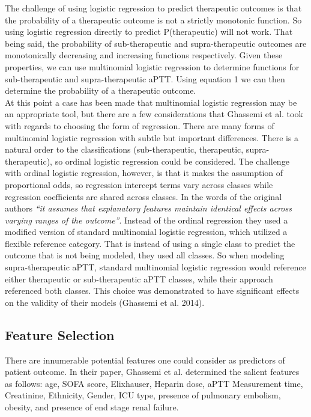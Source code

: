 \documentclass[12pt,a4paper,]{report}
\begin{document}
The challenge of using logistic regression to predict therapeutic
outcomes is that the probability of a therapeutic outcome is not a
strictly monotonic function. So using logistic regression directly to
predict P(therapeutic) will not work. That being said, the probability
of sub-therapeutic and supra-therapeutic outcomes are monotonically
decreasing and increasing functions respectively. Given these
properties, we can use multinomial logistic regression to determine
functions for sub-therapeutic and supra-therapeutic aPTT. Using equation
1 we can then determine the probability of a therapeutic outcome.\\
At this point a case has been made that multinomial logistic regression
may be an appropriate tool, but there are a few considerations that
Ghassemi et al. took with regards to choosing the form of regression.
There are many forms of multinomial logistic regression with subtle but
important differences. There is a natural order to the classifications
(sub-therapeutic, therapeutic, supra-therapeutic), so ordinal logistic
regression could be considered. The challenge with ordinal logistic
regression, however, is that it makes the assumption of proportional
odds, so regression intercept terms vary across classes while regression
coefficients are shared across classes. In the words of the original
authors \emph{``it assumes that explanatory features maintain identical
effects across varying ranges of the outcome''}. Instead of the ordinal
regression they used a modified version of standard multinomial logistic
regression, which utilized a flexible reference category. That is
instead of using a single class to predict the outcome that is not being
modeled, they used all classes. So when modeling supra-therapeutic aPTT,
standard multinomial logistic regression would reference either
therapeutic or sub-therapeutic aPTT classes, while their approach
referenced both classes. This choice was demonstrated to have
significant effects on the validity of their models (Ghassemi et al.
2014).

\subsection{Feature Selection}\label{feature-selection}

There are innumerable potential features one could consider as
predictors of patient outcome. In their paper, Ghassemi et al.
determined the salient features as follows: age, SOFA score, Elixhauser,
Heparin dose, aPTT Measurement time, Creatinine, Ethnicity, Gender, ICU
type, presence of pulmonary embolism, obesity, and presence of end stage
renal failure.
\end{document}
